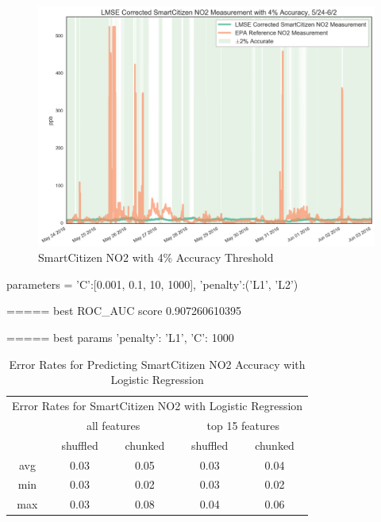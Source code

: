 \begin{figure}[htb]
 	\includegraphics[width=\textwidth]{figs/sck_no2_with_4_accuracy_zoomed}               
 	 \caption{SmartCitizen NO2 with 4\% Accuracy Threshold}
  	\label{fig:sck_no2_with_4_accuracy_zoomed}
\end{figure}





parameters = {'C':[0.001, 0.1, 10, 1000], 'penalty':('L1', 'L2') }

===== best ROC\_AUC score 0.907260610395

===== best params {'penalty': 'L1', 'C': 1000}



\begin{table}[H]
\centering
\begin{tabular}{|c|c|c|c|c|}
\toprule
\multicolumn{5}{|c|}{Error Rates for SmartCitizen NO2 with Logistic Regression} \\
&\multicolumn{2}{|c|}{all features} & \multicolumn{2}{|c|}{top 15 features} \\
&shuffled & chunked & shuffled & chunked \\
avg & 0.03 & 0.05 & 0.03 & 0.04 \\
min & 0.03 & 0.02 & 0.03 & 0.02 \\
max & 0.03 & 0.08 & 0.04 & 0.06 \\
\bottomrule
\end{tabular}
\label{tab:as1_co_error_rates}
\caption{Error Rates for Predicting SmartCitizen NO2 Accuracy with Logistic Regression}
\end{table}



